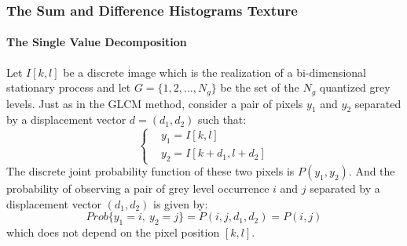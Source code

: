 


\subsubsection{The Sum and Difference Histograms Texture}
\label{sec:sum_and_diff_hist_texture}
\paragraph{The Single Value Decomposition}
Let $I[k,l]$ be a discrete image which is the realization of a bi-dimensional stationary process and let $G=\{1, 2,...,N_g\}$ be the set of the $N_g$ quantized grey levels.
Just as in the GLCM method, consider a pair of pixels $y_1$ and $y_2$ separated by a displacement vector $d = (d_1, d_2)$ such that:
\begin{equation}
\begin{cases}
&y_1 = I[k,l]\\
&y_2 = I[k+d_1, l+d_2]
\end{cases}
\end{equation}
The discrete joint probability function of these two pixels is $P(y_1, y_2)$. And the probability of observing a pair of grey level occurrence $i$ and $j$ separated by a displacement vector $(d_1, d_2)$ is given by:
\begin{equation}
    Prob\{y_1=i,\  y_2=j\} = P(i,j,d_1,d_2) = P(i,j)
\end{equation}
which does not depend on the pixel position $[k,l]$.

